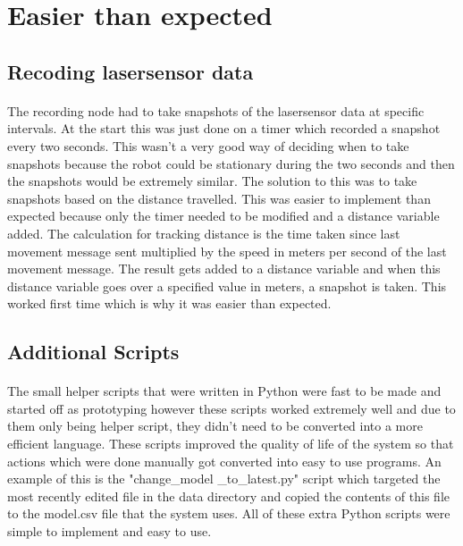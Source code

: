 \section{Easier than expected}
\subsection{Recoding lasersensor data}
\paragraph{}
The recording node had to take snapshots of the lasersensor data at specific intervals. At the start this was just done on a timer which recorded a snapshot every two seconds. This wasn't a very good way of deciding when to take snapshots because the robot could be stationary during the two seconds and then the snapshots would be extremely similar. The solution to this was to take snapshots based on the distance travelled. This was easier to implement than expected because only the timer needed to be modified and a distance variable added. The calculation for tracking distance is the time taken since last movement message sent multiplied by the speed in meters per second of the last movement message. The result gets added to a distance variable and when this distance variable goes over a specified value in meters, a snapshot is taken. This worked first time which is why it was easier than expected.

\subsection{Additional Scripts}
\paragraph{}
The small helper scripts that were written in Python were fast to be made and started off as prototyping however these scripts worked extremely well and due to them only being helper script, they didn't need to be converted into a more efficient language. These scripts improved the quality of life of the system so that actions which were done manually got converted into easy to use programs. An example of this is the "change\_model \_to\_latest.py" script which targeted the most recently edited file in the data\/ directory and copied the contents of this file to the model.csv file that the system uses. All of these extra Python scripts were simple to implement and easy to use.

